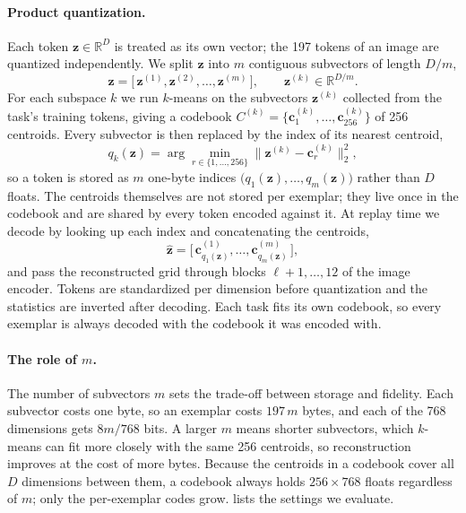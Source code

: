 \paragraph{Product quantization.} Each token $\mathbf{z} \in \mathbb{R}^{D}$ is treated as its own vector; the 197 tokens of an image are quantized independently. We split $\mathbf{z}$ into $m$ contiguous subvectors of length $D/m$,
\begin{equation}
\mathbf{z} = \big[\, \mathbf{z}^{(1)}, \mathbf{z}^{(2)}, \dots, \mathbf{z}^{(m)} \,\big], \qquad \mathbf{z}^{(k)} \in \mathbb{R}^{D/m}.
\end{equation}
For each subspace $k$ we run $k$-means on the subvectors $\mathbf{z}^{(k)}$ collected from the task's training tokens, giving a codebook $C^{(k)} = \{\mathbf{c}^{(k)}_1, \dots, \mathbf{c}^{(k)}_{256}\}$ of 256 centroids. Every subvector is then replaced by the index of its nearest centroid,
\begin{equation}
q_k(\mathbf{z}) = \arg\min_{r \in \{1,\dots,256\}} \big\| \mathbf{z}^{(k)} - \mathbf{c}^{(k)}_r \big\|_2^2 ,
\end{equation}
so a token is stored as $m$ one-byte indices $\big(q_1(\mathbf{z}), \dots, q_m(\mathbf{z})\big)$ rather than $D$ floats. The centroids themselves are not stored per exemplar; they live once in the codebook and are shared by every token encoded against it. At replay time we decode by looking up each index and concatenating the centroids,
\begin{equation}
\hat{\mathbf{z}} = \big[\, \mathbf{c}^{(1)}_{q_1(\mathbf{z})}, \dots, \mathbf{c}^{(m)}_{q_m(\mathbf{z})} \,\big],
\end{equation}
and pass the reconstructed grid through blocks $\ell+1, \dots, 12$ of the image encoder. Tokens are standardized per dimension before quantization and the statistics are inverted after decoding. Each task fits its own codebook, so every exemplar is always decoded with the codebook it was encoded with.

\paragraph{The role of $m$.} The number of subvectors $m$ sets the trade-off between storage and fidelity. Each subvector costs one byte, so an exemplar costs $197\,m$ bytes, and each of the 768 dimensions gets $8m/768$ bits. A larger $m$ means shorter subvectors, which $k$-means can fit more closely with the same 256 centroids, so reconstruction improves at the cost of more bytes. Because the centroids in a codebook cover all $D$ dimensions between them, a codebook always holds $256 \times 768$ floats regardless of $m$; only the per-exemplar codes grow.  lists the settings we evaluate.

